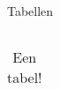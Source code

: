 \begin{frame}[fragile]{Tabellen}
\begin{columns}
\begin{column}{0.5\textwidth}
\begin{adjustbox}{frame=1pt 10pt}
\begin{minipage}{\textwidth-22pt}
\begin{table}[H]
\begin{tabularx}{\textwidth}{X>{\raggedleft\arraybackslash}X}
                            \bottomrule
                        \end{tabularx}
                        \caption{Een tabel!}
                    \end{table}
                    \vspace{-20pt}
                \end{minipage}
            \end{adjustbox}
        \end{column}
    \end{columns}
\end{frame}



